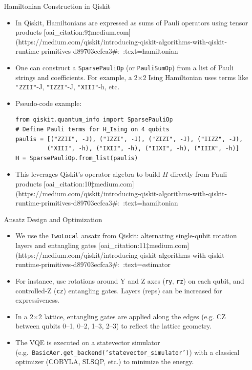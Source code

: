 \documentclass{beamer}
\begin{document}
\begin{frame}{Hamiltonian Construction in Qiskit}
\begin{itemize}
\item In Qiskit, Hamiltonians are expressed as sums of Pauli operators using tensor products [oai_citation:9‡medium.com](https://medium.com/qiskit/introducing-qiskit-algorithms-with-qiskit-runtime-primitives-d89703ecfca3#:~:text=hamiltonian%
\item One can construct a \texttt{SparsePauliOp} (or \texttt{PauliSumOp}) from a list of Pauli strings and coefficients. For example, a 2×2 Ising Hamiltonian uses terms like \verb|"ZZII"|-J, \verb|"IZZI"|-J, \verb|"XIII"|-h, etc.
\item Pseudo-code example:
\begin{verbatim}
from qiskit.quantum_info import SparsePauliOp
# Define Pauli terms for H_Ising on 4 qubits
paulis = [("ZZII", -J), ("IZZI", -J), ("ZIZI", -J), ("IIZZ", -J),
         ("XIII", -h), ("IXII", -h), ("IIXI", -h), ("IIIX", -h)]
H = SparsePauliOp.from_list(paulis)
\end{verbatim}
\item This leverages Qiskit's operator algebra to build $H$ directly from Pauli products [oai_citation:10‡medium.com](https://medium.com/qiskit/introducing-qiskit-algorithms-with-qiskit-runtime-primitives-d89703ecfca3#:~:text=hamiltonian%
\end{itemize}
\end{frame}

\begin{frame}{Ansatz Design and Optimization}
\begin{itemize}
\item We use the \texttt{TwoLocal} ansatz from Qiskit: alternating single-qubit rotation layers and entangling gates [oai_citation:11‡medium.com](https://medium.com/qiskit/introducing-qiskit-algorithms-with-qiskit-runtime-primitives-d89703ecfca3#:~:text=estimator%
\item For instance, use rotations around Y and Z axes (\texttt{ry}, \texttt{rz}) on each qubit, and controlled-Z (\texttt{cz}) entangling gates. Layers (reps) can be increased for expressiveness.
\item In a 2×2 lattice, entangling gates are applied along the edges (e.g. CZ between qubits 0–1, 0–2, 1–3, 2–3) to reflect the lattice geometry.
\item The VQE is executed on a statevector simulator (e.g.\ \texttt{BasicAer.get_backend('statevector_simulator')}) with a classical optimizer (COBYLA, SLSQP, etc.) to minimize the energy.
\end{itemize}
\end{frame}
\end{document}
